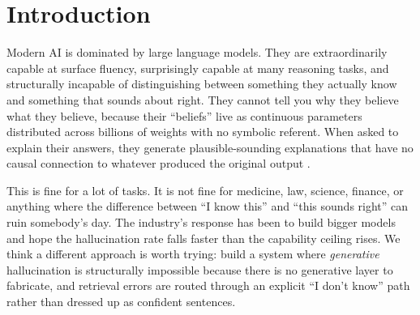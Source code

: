 \documentclass[11pt]{article}
\begin{document}
\begin{abstract}
\begin{itemize}[noitemsep, topsep=2pt]
      thread. The enabler is shard-local cleanup: a shard's bundle
      can only contain what that shard stored, so per-query cost is
      independent of vocabulary size (\S\ref{sec:scale}).
\item A confidence-weighted analogy solver improves accuracy from
      88.7\% to 93.9\% on a 115-probe commonsense benchmark, while
      surfacing calibrated probabilities for each candidate.
\item Sparse-binary HRR, while attractive on per-atom memory grounds,
      has 8--16$\times$ lower per-shard capacity than dense bipolar
      HRR and is not a drop-in substrate replacement.
\end{itemize}

We release the full implementation (\textasciitilde{}18,800 lines of
Python, 757 tests) under the Apache 2.0 license at
\url{https://github.com/NORTHTEKDevs/rck}. Our aim is not to argue
that RCK replaces LLMs but to show that a coherent alternative
architecture---one that is auditable, editable, and structurally
honest about its own uncertainty---is both achievable and useful
today, on commodity hardware, with no GPU.
\end{abstract}

\section{Introduction}

Modern AI is dominated by large language models. They are
extraordinarily capable at surface fluency, surprisingly capable at
many reasoning tasks, and structurally incapable of distinguishing
between something they actually know and something that sounds about
right. They cannot tell you why they believe what they believe,
because their ``beliefs'' live as continuous parameters distributed
across billions of weights with no symbolic referent. When asked to
explain their answers, they generate plausible-sounding explanations
that have no causal connection to whatever produced the original
output \cite{hallucination_survey}.

This is fine for a lot of tasks. It is not fine for medicine, law,
science, finance, or anything where the difference between ``I know
this'' and ``this sounds right'' can ruin somebody's day. The
industry's response has been to build bigger models and hope the
hallucination rate falls faster than the capability ceiling rises.
We think a different approach is worth trying: build a system where
\emph{generative} hallucination is structurally impossible because
there is no generative layer to fabricate, and retrieval errors are
routed through an explicit ``I don't know'' path rather than dressed
up as confident sentences.
\end{document}
